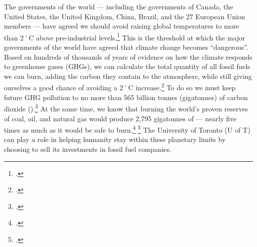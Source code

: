 \documentclass[10pt]{article}
\begin{document}
The governments of the world --- including the governments of Canada, the United States, the United Kingdom, China, Brazil, and the 27 European Union members --- have agreed we should avoid raising global temperatures to more than 2˚C above pre-industrial levels.\footcite[][]{CopenhagenAccord}
This is the threshold at which the major governments of the world have agreed that climate change becomes ``dangerous''.
Based on hundreds of thousands of years of evidence on how the climate responds to greenhouse gases (GHGs), we can calculate the total quantity of all fossil fuels we can burn, adding the carbon they contain to the atmosphere, while still giving ourselves a good chance of avoiding a 2˚C increase.\footcite[Research published in \emph{Nature} highlights how even a limit of 2˚C of warming ``is not sufficient to control many other quantities, such as transient sea level rise, ocean acidification and net primary production on land''. Limiting warming to a lesser level would require even more aggressive action than described in this brief.][p. 197]{Steinacher2013}
To do so we must keep future GHG pollution to no more than 565 billion tonnes (gigatonnes) of carbon dioxide ().\footcite[For a more detailed explanation that is accessible to non-experts see: ][]{TerrifyingNewMath}
At the same time, we know that burning the world's proven reserves of coal, oil, and natural gas would produce 2,795 gigatonnes of  --- nearly five times as much as it would be safe to burn.\footcite[][]{CTI2012} \footcite[Another accessible summary of the issue can be found in this free hour-long radio program: ][]{HotBackyard}
The University of Toronto (U of T) can play a role in helping humanity stay within these planetary limits by choosing to sell its investments in fossil fuel companies.
\end{document}
